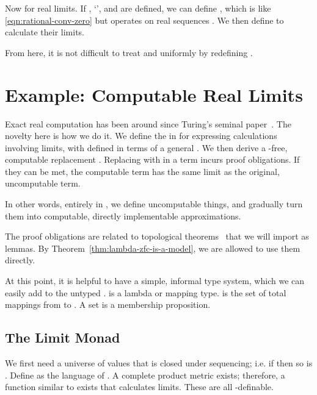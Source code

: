 Now for real limits. If \tlzfc{\Re^+}, `\tlzfc{<}', and \tlzfc{|\cdot|} are defined, we can define , which is like \eqref{eqn:rational-conv-zero} but operates on real sequences . We then define  to calculate their limits.

From here, it is not difficult to treat \tlzfc{\Rat} and \tlzfc{\Re} uniformly by redefining \tlzfc{\Rat \subset \Re}.


\section{Example: Computable Real Limits}
\label{sec:limit-monad}

\newcommand{\seqtype}[1]{\lnat \to {#1}}

Exact real computation has been around since Turing's seminal paper~\cite{cit:turing}. The novelty here is how we do it. We define the  in \targetlang for expressing calculations involving limits, with  defined in terms of a general . We then derive a -free, computable replacement . Replacing  with  in a \targetlang term incurs proof obligations. If they can be met, the computable \targetlang term has the same limit as the original, uncomputable term.

In other words, entirely in \targetlang, we define uncomputable things, and gradually turn them into computable, directly implementable approximations.

The proof obligations are related to topological theorems~\cite{cit:munkres-topology} that we will import as lemmas. By Theorem~\ref{thm:lambda-zfc-is-a-model}, we are allowed to use them directly.

At this point, it is helpful to have a simple, informal type system, which we can easily add to the untyped \targetlang.  is a lambda or mapping type.  is the set of total mappings from  to . A set is a membership proposition.


\subsection{The Limit Monad}

\newcommand{\metricuniv}{\mathbb{U}}

We first need a universe \tlzfc{\metricuniv} of values that is closed under sequencing; i.e. if \tlzfc{A \subset \metricuniv} then so is . Define \tlzfc{\metricuniv} as the language of . A complete product metric \tlzfc{\delta : \metricuniv \tto \metricuniv \tto \Re} exists; therefore, a function \tlzfc{limit : (\lnat \to \metricuniv) \tto \metricuniv} similar to  exists that calculates limits. These are all \targetlang-definable.

